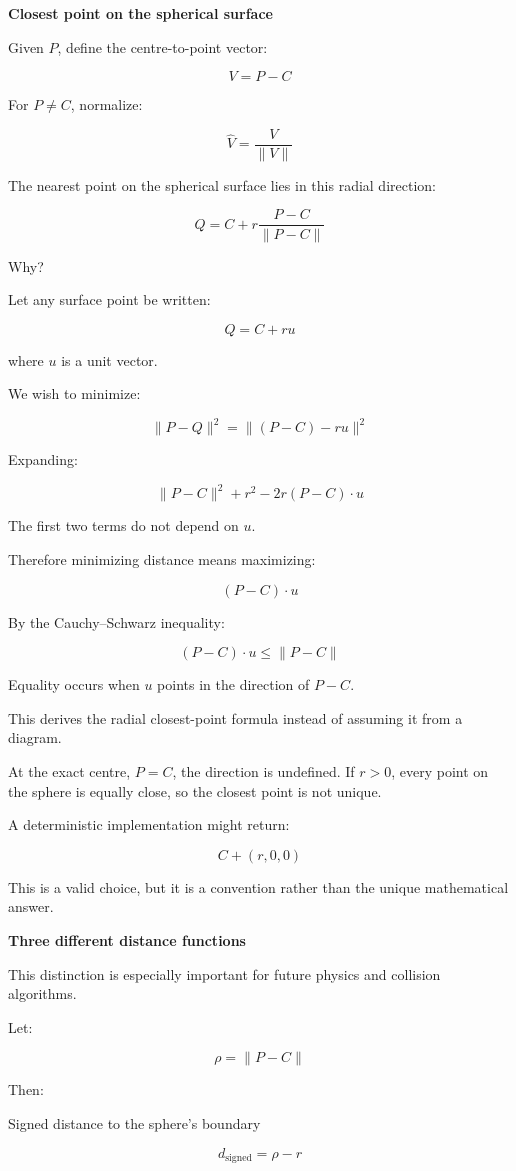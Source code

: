 \textbf{Closest point on the spherical surface}

Given \(P\), define the centre-to-point vector:

\[
V=P-C
\]

For \(P\ne C\), normalize:

\[
\hat V=\frac{V}{\|V\|}
\]

The nearest point on the spherical surface lies in this radial direction:

\[
\boxed{ Q=C+r\frac{P-C}{\|P-C\|} }
\]

Why?

Let any surface point be written:

\[
Q=C+ru
\]

where \(u\) is a unit vector.

We wish to minimize:

\[
\|P-Q\|^2 =\|(P-C)-ru\|^2
\]

Expanding:

\[
\|P-C\|^2+r^2-2r(P-C)\cdot u
\]

The first two terms do not depend on \(u\).

Therefore minimizing distance means maximizing:

\[
(P-C)\cdot u
\]

By the Cauchy--Schwarz inequality:

\[
(P-C)\cdot u\le\|P-C\|
\]

Equality occurs when \(u\) points in the direction of \(P-C\).

This derives the radial closest-point formula instead of assuming it from a diagram.

At the exact centre, \(P=C\), the direction is undefined. If \(r>0\), every point on the sphere is equally close, so the closest point is not unique.

A deterministic implementation might return:

\[
C+(r,0,0)
\]

This is a valid choice, but it is a convention rather than the unique mathematical answer.

\textbf{Three different distance functions}

This distinction is especially important for future physics and collision algorithms.

Let:

\[
\rho=\|P-C\|
\]

Then:

Signed distance to the sphere's boundary

\[
\boxed{d_{\mathrm{signed}}=\rho-r}
\]

